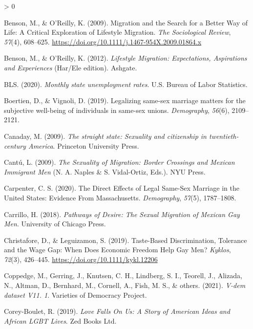 \documentclass[
  11pt,
]{article}
\newlength{\cslhangindent}
\newenvironment{CSLReferences}[2] %
 {%
  \setlength{\parindent}{0pt}
  \ifodd #1 \everypar{\setlength{\hangindent}{\cslhangindent}}\ignorespaces\fi
  \ifnum #2 > 0
  \setlength{\parskip}{#2\baselineskip}
  \fi
 }%
 {}
\begin{document}
\begin{CSLReferences}{1}{0}
\leavevmode\hypertarget{ref-benson_2009}{}%
Benson, M., \& O'Reilly, K. (2009). Migration and the {Search} for a {Better Way} of {Life}: {A Critical Exploration} of {Lifestyle Migration}. \emph{The Sociological Review}, \emph{57}(4), 608--625. \url{https://doi.org/10.1111/j.1467-954X.2009.01864.x}

\leavevmode\hypertarget{ref-benson_2012}{}%
Benson, M., \& O'Reilly, K. (2012). \emph{Lifestyle {Migration}: {Expectations}, {Aspirations} and {Experiences}} (Har/Ele edition). {Ashgate}.

\leavevmode\hypertarget{ref-bls_2020}{}%
BLS. (2020). \emph{Monthly state unemployment rates}. {U.S. Bureau of Labor Statistics}.

\leavevmode\hypertarget{ref-boertien_2019}{}%
Boertien, D., \& Vignoli, D. (2019). Legalizing same-sex marriage matters for the subjective well-being of individuals in same-sex unions. \emph{Demography}, \emph{56}(6), 2109--2121.

\leavevmode\hypertarget{ref-canaday_2009}{}%
Canaday, M. (2009). \emph{The straight state: Sexuality and citizenship in twentieth-century {America}}. {Princeton University Press}.

\leavevmode\hypertarget{ref-cantu_2009}{}%
Cantú, L. (2009). \emph{The {Sexuality} of {Migration}: {Border Crossings} and {Mexican Immigrant Men}} (N. A. Naples \& S. Vidal-Ortiz, Eds.). {NYU Press}.

\leavevmode\hypertarget{ref-carpenter_2020}{}%
Carpenter, C. S. (2020). The {Direct Effects} of {Legal Same}-{Sex Marriage} in the {United States}: {Evidence From Massachusetts}. \emph{Demography}, \emph{57}(5), 1787--1808.

\leavevmode\hypertarget{ref-carrillo_2018}{}%
Carrillo, H. (2018). \emph{Pathways of {Desire}: {The Sexual Migration} of {Mexican Gay Men}}. {University of Chicago Press}.

\leavevmode\hypertarget{ref-christafore_2019}{}%
Christafore, D., \& Leguizamon, S. (2019). Taste-{Based Discrimination}, {Tolerance} and the {Wage Gap}: {When Does Economic Freedom Help Gay Men}? \emph{Kyklos}, \emph{72}(3), 426--445. \url{https://doi.org/10.1111/kykl.12206}

\leavevmode\hypertarget{ref-coppedge_2021}{}%
Coppedge, M., Gerring, J., Knutsen, C. H., Lindberg, S. I., Teorell, J., Alizada, N., Altman, D., Bernhard, M., Cornell, A., Fish, M. S., \& others. (2021). \emph{V-dem dataset V11. 1}. {Varieties of Democracy Project}.

\leavevmode\hypertarget{ref-corey-boulet_2019}{}%
Corey-Boulet, R. (2019). \emph{Love {Falls On Us}: {A Story} of {American Ideas} and {African LGBT Lives}}. {Zed Books Ltd.}


\end{CSLReferences}
\end{document}
